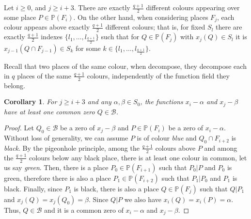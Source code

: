 \documentclass{amsart}
\newcommand{\m}{\mathcal}
\renewcommand{\P}{\mathbb{P}}
\newtheorem{cor}[thm]{Corollary}
\theoremstyle{definition}
\begin{document}
Let $i \geq 0$, and $j \geq i+3$. There are exactly $\frac{q+1}{2}$ different colours appearing over some place $P \in \P(F_i)$. On the other hand, when considering places $F_j$, each colour appears above exactly $\frac{q+1}{2}$ different colours; that is, for fixed $S_l$ there are exactly $\frac{q+1}{2}$ indexes $\{l_1, \ldots, l_{ \frac{q+1}{2} } \}$ such that for $Q \in \P(F_j)$ with $x_j(Q) \in S_l$ it is $x_{j-1}(Q \cap F_{j-1}) \in S_{k}$ for some $k \in \{l_1, \ldots, l_{ \frac{q+1}{2} } \}$.

Recall that two places of the same colour, when decompose, they decompose each in $q$ places of the same $\frac{q+1}{2}$ colours, independently of the function field they belong.


\begin{cor}\label{cerosencomun}
	For $j \geq i+3$ and any $\alpha, \beta \in S_0$, the functions $x_i-\alpha$ and $x_j-\beta$ have at least one common zero $Q \in \m{B}$.
\end{cor}

\begin{proof} Let $Q_0 \in \m{B}$ be a zero of $x_j-\beta$ and $P \in \P(F_i)$ be a zero of $x_i-\alpha$. Without loss of generality, we can assume $P$ is of colour \textit{blue} and $Q_0 \cap F_{i+2}$ is \textit{black}. By the pigeonhole principle, among the $\frac{q+1}{2}$ colours above $P$ and among the $\frac{q+1}{2}$ colours below any black place, there is at least one colour in common, let us say \textit{green}. Then, there is a place $P_0 \in \P(F_{i+1})$ such that $P_0|P$ and $P_0$ is green, therefore there is also a place $P_1 \in \P(F_{i+2})$ such that $P_1|P_0$ and $P_1$ is black.  Finally, since $P_1$ is black, there is also a place $Q \in \P(F_j)$ such that $Q|P_1$ and $x_j(Q) = x_j(Q_0) = \beta$. Since $Q | P$ we also have $x_i(Q)=x_i(P) = \alpha$. Thus, $Q \in \m{B}$ and it is a common zero of $x_i-\alpha$ and $x_j-\beta$.
\end{proof}
\end{document}
